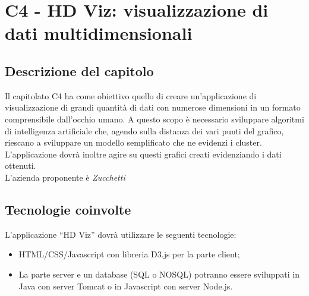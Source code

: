\section{C4 - HD Viz: visualizzazione di dati multidimensionali}

\subsection{Descrizione del capitolo}
Il capitolato C4 ha come obiettivo quello di creare un'applicazione di visualizzazione di grandi quantità di dati con numerose dimensioni in un formato comprensibile dall'occhio umano. A questo scopo è necessario sviluppare algoritmi di intelligenza artificiale che, agendo sulla distanza dei vari punti del grafico, riescano a sviluppare un modello semplificato che ne evidenzi i cluster. %
L'applicazione dovrà inoltre agire su questi grafici creati evidenziando i dati ottenuti.\\
L'azienda proponente è \textit{Zucchetti}

\subsection{Tecnologie coinvolte}
L'applicazione “HD Viz” dovrà utilizzare le seguenti tecnologie:
\begin{itemize}
\item HTML/CSS/Javascript con libreria D3.js per la parte client;
\item La parte server e un database (SQL o NOSQL) potranno essere sviluppati in Java con server Tomcat o in Javascript con server Node.js.
\end{itemize}

